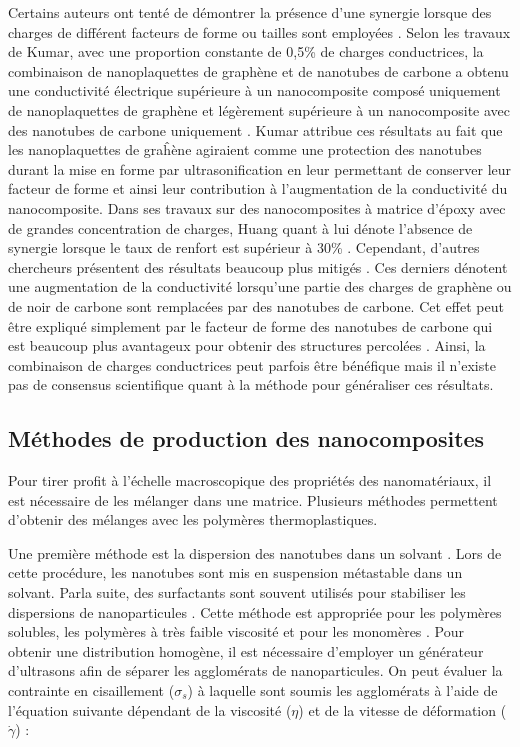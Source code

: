 Certains auteurs ont tenté de démontrer la présence d'une synergie lorsque des charges de différent facteurs de forme ou tailles sont employées \cite{Kumar2010,Huang2012a,Dweiri2015,Wei2010,Safdari2012}.
Selon les travaux de Kumar, avec une proportion constante de 0,5\% de charges conductrices, la combinaison de nanoplaquettes de graphène et de nanotubes de carbone a obtenu une conductivité électrique supérieure à un nanocomposite composé uniquement de nanoplaquettes de graphène et légèrement supérieure à un nanocomposite avec des nanotubes de carbone uniquement \cite{Kumar2010}. 
Kumar attribue ces résultats au fait que les nanoplaquettes de graĥène agiraient comme une protection des nanotubes durant la mise en forme par ultrasonification en leur permettant de conserver leur facteur de forme et ainsi leur contribution à l'augmentation de la conductivité du nanocomposite. 
Dans ses travaux sur des nanocomposites à matrice d'époxy avec de grandes concentration de charges, Huang quant à lui dénote l'absence de synergie lorsque le taux de renfort est supérieur à 30\% \cite{Huang2012a}. 
Cependant, d'autres chercheurs présentent des résultats beaucoup plus mitigés \cite{Dweiri2015,Wei2010}. 
Ces derniers dénotent une augmentation de la conductivité lorsqu'une partie des charges de graphène ou de noir de carbone sont remplacées par des nanotubes de carbone. 
Cet effet peut être expliqué simplement par le facteur de forme des nanotubes de carbone qui est beaucoup plus avantageux pour obtenir des structures percolées \cite{Safdari2012}. 
Ainsi, la combinaison de charges conductrices peut parfois être bénéfique mais il n'existe pas de consensus scientifique quant à la méthode pour généraliser ces résultats. 

\subsection{Méthodes de production des nanocomposites}

Pour tirer profit à l'échelle macroscopique des propriétés des nanomatériaux, il est nécessaire de les mélanger dans une matrice. 
Plusieurs méthodes permettent d'obtenir des mélanges avec les polymères thermoplastiques. 

Une première méthode est la dispersion des nanotubes dans un solvant \cite{Mohammad2006}.
Lors de cette procédure, les nanotubes sont mis en suspension métastable dans un solvant. 
Parla suite, des surfactants sont souvent utilisés pour stabiliser les dispersions de nanoparticules \cite{Huang2012}. 
Cette méthode est appropriée pour les polymères solubles, les polymères à très faible viscosité et pour les monomères \cite{Ma2010}. 
Pour obtenir une distribution homogène, il est nécessaire d'employer un générateur d'ultrasons afin de séparer les agglomérats de nanoparticules. 
On peut évaluer la contrainte en cisaillement ($\sigma_s$) à laquelle sont soumis les agglomérats à l'aide de l'équation suivante dépendant de la viscosité ($\eta$) et de la vitesse de déformation ($\dot{\gamma}$) : 

